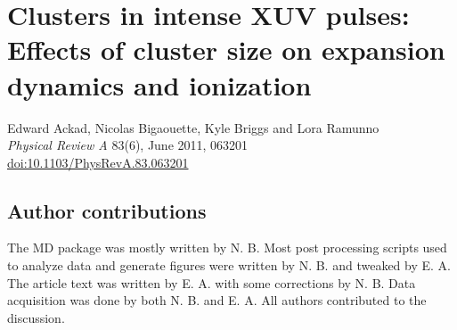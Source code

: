 
\newcommand{\PaperTitleSize}{Clusters in intense XUV pulses: Effects of cluster size on expansion
                             dynamics and ionization}

\section{\PaperTitleSize}
\label{section:papers:size}

\begin{flushright}
Edward Ackad, Nicolas Bigaouette, Kyle Briggs and Lora Ramunno\\
\textit{Physical Review A} 83(6), June 2011, 063201\\
\href{http://dx.doi.org/10.1103/PhysRevA.83.063201}{doi:10.1103/PhysRevA.83.063201}
\end{flushright}


\HidePDFAbstractNumber

\subsection{Author contributions}
The MD package was mostly written by N. B. Most post processing scripts used to
analyze data and generate figures were written by N. B. and tweaked by E. A.
The article text was written by E. A. with some corrections by N. B. Data
acquisition was done by both N. B. and E. A. All authors contributed to the
discussion.



